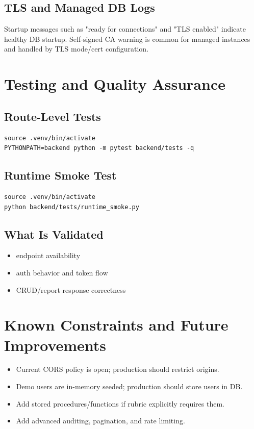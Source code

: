 \documentclass[11pt,a4paper]{article}
\begin{document}
\subsection{TLS and Managed DB Logs}
Startup messages such as "ready for connections" and "TLS enabled" indicate healthy DB startup. Self-signed CA warning is common for managed instances and handled by TLS mode/cert configuration.

\section{Testing and Quality Assurance}
\subsection{Route-Level Tests}
\begin{lstlisting}[language={}]
source .venv/bin/activate
PYTHONPATH=backend python -m pytest backend/tests -q
\end{lstlisting}

\subsection{Runtime Smoke Test}
\begin{lstlisting}[language={}]
source .venv/bin/activate
python backend/tests/runtime_smoke.py
\end{lstlisting}

\subsection{What Is Validated}
\begin{itemize}
  \item endpoint availability
  \item auth behavior and token flow
  \item CRUD/report response correctness
\end{itemize}

\section{Known Constraints and Future Improvements}
\begin{itemize}
  \item Current CORS policy is open; production should restrict origins.
  \item Demo users are in-memory seeded; production should store users in DB.
  \item Add stored procedures/functions if rubric explicitly requires them.
  \item Add advanced auditing, pagination, and rate limiting.
\end{itemize}
\end{document}
